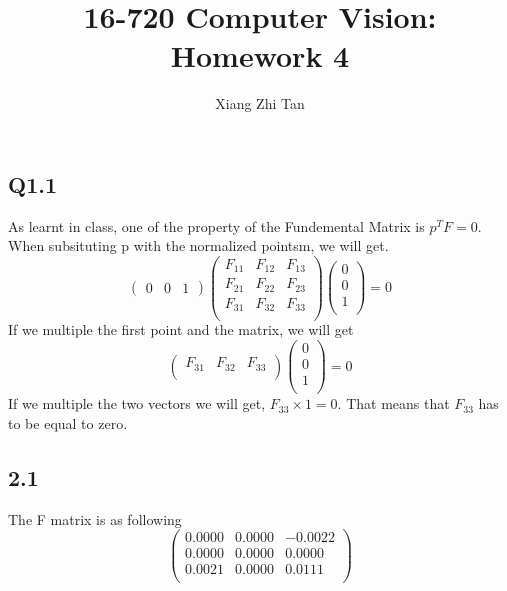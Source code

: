 \documentclass{article}
\begin{document}
\title{16-720 Computer Vision: Homework 4}
\author{Xiang Zhi Tan}

\maketitle
\subsection*{Q1.1}
As learnt in class, one of the property of the Fundemental Matrix is $p^TF = 0$. When subsituting p with the normalized pointsm, we will get.
\begin{equation*}
\begin{pmatrix}
0 & 0 & 1
\end{pmatrix}
\begin{pmatrix}
F_{11}&F_{12}&F_{13}\\
F_{21}&F_{22}&F_{23}\\
F_{31}&F_{32}&F_{33}\\
\end{pmatrix}
\begin{pmatrix}
0\\
0\\
1\\
\end{pmatrix}
= 0
\end{equation*}
If we multiple the first point and the matrix, we will get
\begin{equation*}
\begin{pmatrix}
F_{31}&F_{32}&F_{33}\\
\end{pmatrix}
\begin{pmatrix}
0\\
0\\
1\\
\end{pmatrix}
= 0
\end{equation*}
If we multiple the two vectors we will get, $F_{33} \times 1 = 0$. That means that $F_{33}$ has to be equal to zero.

\subsection*{2.1}
The F matrix is as following
\begin{equation*}
\begin{pmatrix}
    0.0000  &  0.0000   &-0.0022\\
    0.0000  &  0.0000   & 0.0000\\
    0.0021  &  0.0000   & 0.0111\\
\end{pmatrix}
\end{equation*}
\end{document}
